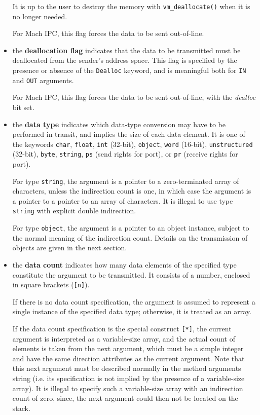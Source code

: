 \begin{itemize}
It is up to the user to destroy the memory with \verb|vm_deallocate()|
when it is no longer needed.

For Mach IPC, this flag forces the data to be sent out-of-line.

\item the {\bf deallocation flag} indicates that the data to be
transmitted must be deallocated from the sender's address space. This
flag is specified by the presence or absence of the \verb|Dealloc|
keyword, and is meaningful both for \verb|IN| and
\verb|OUT| arguments.

For Mach IPC, this flag forces the data to be sent out-of-line, with
the {\em dealloc} bit set.

\item the {\bf data type} indicates which data-type conversion may
have to be performed in transit, and implies the size of each data
element. It is one of the keywords \verb|char|, \verb|float|,
\verb|int| (32-bit), \verb|object|, \verb|word| (16-bit),
\verb|unstructured| (32-bit), \verb|byte|, \verb|string|, \verb|ps|
(send rights for port), or \verb|pr| (receive rights for port).

For type \verb|string|, the argument is a pointer to a zero-terminated
array of characters, unless the indirection count is one, in which
case the argument is a pointer to a pointer to an array of characters.
It is illegal to use type \verb|string| with explicit double
indirection.

For type \verb|object|, the argument is a pointer to an object
instance, subject to the normal meaning of the indirection count.
Details on the transmission of objects are given in the next section.

\item the {\bf data count} indicates how many data elements of the
specified type constitute the argument to be transmitted. It consists
of a number, enclosed in square brackets (\verb|[n]|).

If there is no data count specification, the argument is assumed to
represent a single instance of the specified data type; otherwise, it
is treated as an array.

If the data count specification is the special construct \verb|[*]|,
the current argument is interpreted as a variable-size array, and
the actual count of elements is taken from the next argument, which
must be a simple integer and have the same direction attributes as the
current argument. Note that this next argument must be described
normally in the method arguments string (i.e. its specification is not
implied by the presence of a variable-size array). It is illegal to
specify such a variable-size array with an indirection count of zero,
since, the next argument could then not be located on the stack.


\end{itemize}
